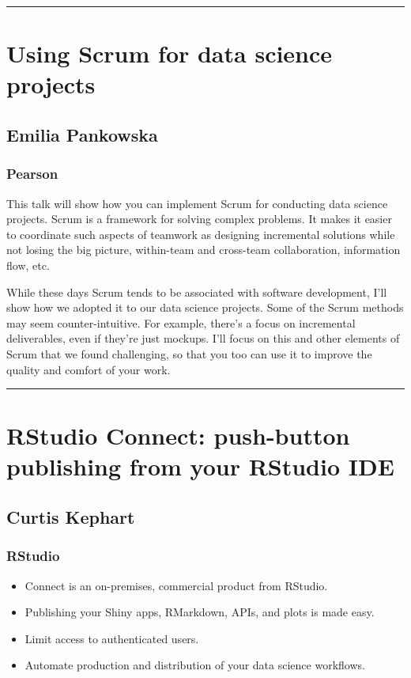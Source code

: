 \documentclass [12pt]{article}
\begin{document}
\noindent\rule{\textwidth}{1pt}
\section{Using Scrum for data science projects}
\subsection*{Emilia	Pankowska}
\subsubsection*{Pearson}

This talk will show how you can implement Scrum for conducting data science projects. Scrum is a framework for solving complex problems. It makes it easier to coordinate such aspects of teamwork as designing incremental solutions while not losing the big picture, within-team and cross-team collaboration, information flow, etc.

While these days Scrum tends to be associated with software development, I’ll show how we adopted it to our data science projects. Some of the Scrum methods may seem counter-intuitive. For example, there’s a focus on incremental deliverables, even if they’re just mockups. I’ll focus on this and other elements of Scrum that we found challenging, so that you too can use it to improve the quality and comfort of your work.

\noindent\rule{\textwidth}{1pt}
\section{RStudio Connect: push-button publishing from your RStudio IDE}
\subsection*{Curtis Kephart}
\subsubsection*{RStudio}
\begin{itemize}
\setlength\itemsep{.15em}
\item Connect is an on-premises, commercial product from RStudio.
\item Publishing your Shiny apps, RMarkdown, APIs, and plots is made easy.
\item Limit access to authenticated users.
\item Automate production and distribution of your data science workflows.
\end{itemize}
\newpage
{}
\end{document}
